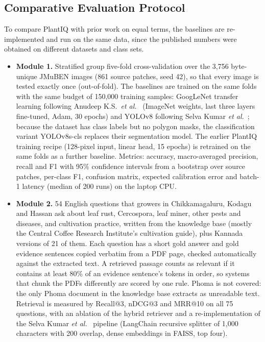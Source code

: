 \subsection{Comparative Evaluation Protocol}
\label{sec:protocol}
To compare PlantIQ with prior work on equal terms, the baselines are re-implemented and run on the same data, since the
published numbers were obtained on different datasets and class sets.
\begin{itemize}
\item \textbf{Module 1.} Stratified group five-fold cross-validation over the 3,756 byte-unique JMuBEN images
(861 source patches, seed 42), so that every image is tested exactly once (out-of-fold). The baselines are trained on the
same folds with the same budget of 150,000 training samples: GoogLeNet transfer learning following Anudeep
K.S.\ \textit{et al.}~\cite{anudeep2024cnn} (ImageNet weights, last three layers fine-tuned, Adam, 30 epochs) and YOLOv8
following Selva Kumar \textit{et al.}~\cite{selvakumar2024rag}; because the dataset has class labels but no polygon
masks, the classification variant YOLOv8s-cls replaces their segmentation model. The earlier PlantIQ training recipe
(128-pixel input, linear head, 15 epochs) is retrained on the same folds as a further baseline. Metrics: accuracy,
macro-averaged precision, recall and F1 with 95\% confidence intervals from a bootstrap over source patches, per-class
F1, confusion matrix, expected calibration error and batch-1 latency (median of 200 runs) on the laptop CPU.
\item \textbf{Module 2.} 54 English questions that growers in Chikkamagaluru, Kodagu and Hassan ask about leaf rust,
Cercospora, leaf miner, other pests and diseases, and cultivation practice, written from the knowledge base (mostly the
Central Coffee Research Institute's cultivation guide), plus Kannada versions of 21 of them. Each question has a short
gold answer and gold evidence sentences copied verbatim from a PDF page, checked automatically against the extracted
text. A retrieved passage counts as relevant if it contains at least 80\% of an evidence sentence's tokens in order, so
systems that chunk the PDFs differently are scored by one rule. Phoma is not covered: the only Phoma document in the
knowledge base extracts as unreadable text. Retrieval is measured by Recall@3, nDCG@3 and MRR@10 on all 75 questions,
with an ablation of the hybrid retriever and a re-implementation of the Selva Kumar \textit{et al.}~\cite{selvakumar2024rag}
pipeline (LangChain recursive splitter of 1{,}000 characters with 200 overlap, dense embeddings in FAISS, top four).

\end{itemize}
